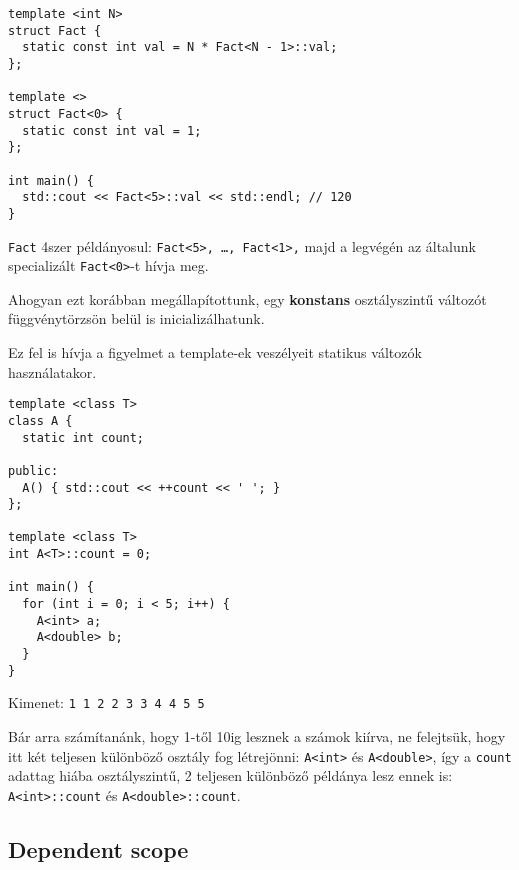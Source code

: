 \documentclass[../cpp_book/cpp_book.tex]{subfiles}
\begin{document}
	\begin{lstlisting}
template <int N>
struct Fact {
  static const int val = N * Fact<N - 1>::val;
};

template <>
struct Fact<0> {
  static const int val = 1;
};

int main() {
  std::cout << Fact<5>::val << std::endl; // 120
}
	\end{lstlisting}
	\texttt{Fact} 4szer példányosul: \texttt{Fact<5>, \ldots, Fact<1>,} majd a legvégén az általunk specializált \texttt{Fact<0>}-t hívja meg.
	\begin{note}
		Ahogyan ezt korábban megállapítottunk, egy \textbf{konstans} osztályszintű változót függvénytörzsön belül is inicializálhatunk.
	\end{note}
	Ez fel is hívja a figyelmet a template-ek veszélyeit statikus változók használatakor.
	
	\begin{lstlisting}
template <class T>
class A {
  static int count;

public:
  A() { std::cout << ++count << ' '; }
};

template <class T>
int A<T>::count = 0;

int main() {
  for (int i = 0; i < 5; i++) {
    A<int> a;
    A<double> b;
  }
}
	\end{lstlisting}
	Kimenet: \texttt{1 1 2 2 3 3 4 4 5 5}
	
	Bár arra számítanánk, hogy 1-től 10ig lesznek a számok kiírva, ne felejtsük, hogy itt két teljesen különböző osztály fog létrejönni: \texttt{A<int>} és \texttt{A<double>}, így a \texttt{count} adattag hiába osztályszintű, 2 teljesen különböző példánya lesz ennek is: \texttt{A<int>::count} és \texttt{A<double>::count}.
	
	\subsection{Dependent scope}
	
\end{document}
